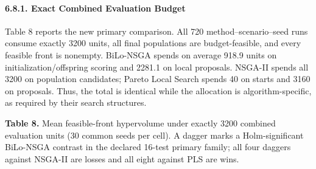 \documentclass[
]{article}
\begin{document}
\paragraph{6.8.1. Exact Combined Evaluation Budget}\label{exact-combined-evaluation-budget}

Table 8 reports the new primary comparison. All 720 method--scenario--seed runs consume exactly 3200 units, all final populations are budget-feasible, and every feasible front is nonempty. BiLo-NSGA spends on average 918.9 units on initialization/offspring scoring and 2281.1 on local proposals. NSGA-II spends all 3200 on population candidates; Pareto Local Search spends 40 on starts and 3160 on proposals. Thus, the total is identical while the allocation is algorithm-specific, as required by their search structures.

\textbf{Table 8.} Mean feasible-front hypervolume under exactly 3200 combined evaluation units (30 common seeds per cell). A dagger marks a Holm-significant BiLo-NSGA contrast in the declared 16-test primary family; all four daggers against NSGA-II are losses and all eight against PLS are wins.
\end{document}
